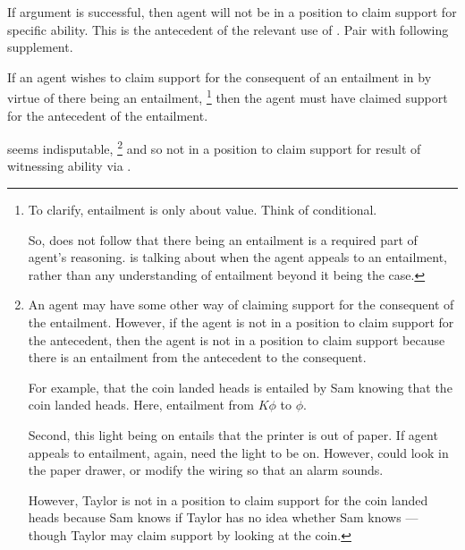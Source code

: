 \begin{note}
  If argument is successful, then agent will not be in a position to claim support for specific ability.
  This is the antecedent of the relevant use of \aben{}.
  Pair \nI{} with following supplement.

  \begin{proposition}[\nIm{}]
    If an agent wishes to claim support for the consequent of an entailment in by virtue of there being an entailment,\nolinebreak
    \footnote{To clarify, entailment is only about value.
      Think of conditional.

      So, does not follow that there being an entailment is a required part of agent's reasoning.
      \nIm{} is talking about when the agent appeals to an entailment, rather than any understanding of entailment beyond it being the case.
    }
    then the agent must have claimed support for the antecedent of the entailment.
  \end{proposition}
  \nIm{} seems indisputable,\nolinebreak
  \footnote{
  An agent may have some other way of claiming support for the consequent of the entailment.
  However, if the agent is not in a position to claim support for the antecedent, then the agent is not in a position to claim support because there is an entailment from the antecedent to the consequent.\nolinebreak

    For example, that the coin landed heads is entailed by Sam knowing that the coin landed heads.
    Here, entailment from \(K\phi\) to \(\phi\).

    Second, this light being on entails that the printer is out of paper.
    If agent appeals to entailment, again, need the light to be on.
    However, could look in the paper drawer, or modify the wiring so that an alarm sounds.

    However, Taylor is not in a position to claim support for the coin landed heads because Sam knows if Taylor has no idea whether Sam knows --- though Taylor may claim support by looking at the coin.
  }
  and so not in a position to claim support for result of witnessing ability via \AR{}.
\end{note}

